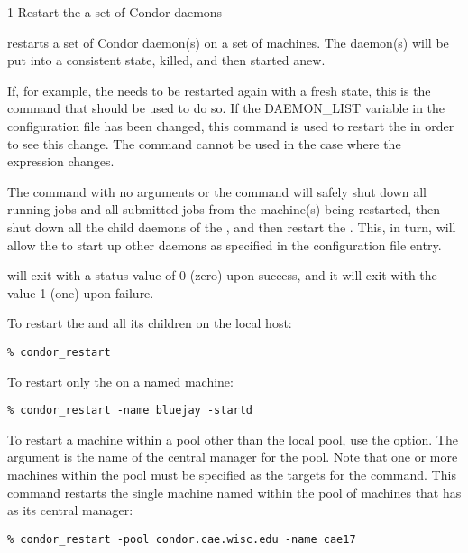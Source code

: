 \begin{ManPage}{\label{man-condor-restart}}{1}
{Restart the a set of Condor daemons}
\Synopsis {}
\ToolArgsBase

\ToolArgsLocate
\ToolArgsAffect

\ToolWhere
\ToolArgsAffect


\Description 

 restarts a set of Condor daemon(s) on a set
of machines.
The daemon(s) will be put into a consistent state,
killed, and then started anew.

If, for example, the  needs to be restarted again with
a fresh state, this is the command that should be used to do so.
If the DAEMON\_LIST variable in the configuration file has
been changed, this command is used to restart the 
in order to see this change.
The  command cannot be used in the case where the
 expression changes.

The command
 with no arguments or the command
will safely shut down all running jobs and all submitted
jobs from the machine(s) being restarted, then shut down
all the child daemons of the ,
and then restart the .
This, in turn, will allow the  to start up
other daemons as specified in the  configuration
file entry.

\begin{Options}
	\ToolArgsDesc
\end{Options}

\ExitStatus

 will exit with a status value of 0 (zero) upon success,
and it will exit with the value 1 (one) upon failure.

\Examples
To restart the  and all its children
on the local host:
\begin{verbatim}
% condor_restart
\end{verbatim}

To restart only the  on a named machine:
\begin{verbatim}
% condor_restart -name bluejay -startd
\end{verbatim}

To restart a machine within a pool
other than the local pool, use the  option.
The argument is the name of the central manager for the pool.
Note that one or more machines within the pool must be
specified as the targets for the command.
This command restarts
the single machine named  within the
pool of machines that has  as
its central manager:
\begin{verbatim}
% condor_restart -pool condor.cae.wisc.edu -name cae17
\end{verbatim}

\end{ManPage}

